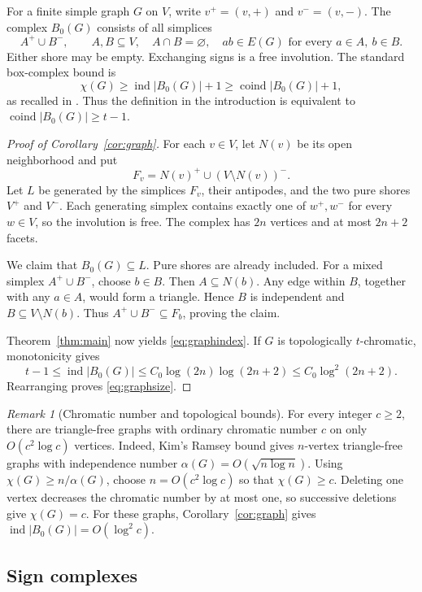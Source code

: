\documentclass[11pt]{article}
\theoremstyle{remark}
\newtheorem{remark}[theorem]{Remark}
\DeclareMathOperator{\ind}{ind}
\DeclareMathOperator{\coind}{coind}
\newcommand{\Czero}{C_0}
\begin{document}
For a finite simple graph $G$ on $V$, write $v^+=(v,+)$ and
$v^-=(v,-)$. The complex $B_0(G)$ consists of all simplices
\[
 A^+\cup B^-,\qquad A,B\subseteq V,\quad A\cap B=\varnothing,
 \quad ab\in E(G)\text{ for every }a\in A,\ b\in B.
\]
Either shore may be empty. Exchanging signs is a free involution.
The standard box-complex bound is
\[
 \chi(G)\geq\ind|B_0(G)|+1
 \geq\coind|B_0(G)|+1,
\]
as recalled in \cite{ST}. Thus the definition in the introduction
is equivalent to $\coind|B_0(G)|\geq t-1$.

\begin{proof}[Proof of Corollary~\ref{cor:graph}]
For each $v\in V$, let $N(v)$ be its open neighborhood and put
\[
 F_v=N(v)^+\cup(V\setminus N(v))^-.
\]
Let $L$ be generated by the simplices $F_v$, their antipodes, and
the two pure shores $V^+$ and $V^-$. Each generating simplex contains
exactly one of $w^+,w^-$ for every $w\in V$, so the involution is free.
The complex has $2n$ vertices and at most $2n+2$ facets.

We claim that $B_0(G)\subseteq L$. Pure shores are already included.
For a mixed simplex $A^+\cup B^-$, choose $b\in B$.
Then $A\subseteq N(b)$. Any edge within $B$, together with any
$a\in A$, would form a triangle. Hence $B$ is independent and
$B\subseteq V\setminus N(b)$.
Thus $A^+\cup B^-\subseteq F_b$, proving the claim.

Theorem~\ref{thm:main} now yields \eqref{eq:graphindex}.
If $G$ is topologically $t$-chromatic, monotonicity gives
\[
 t-1\leq\ind|B_0(G)|
 \leq\Czero\log(2n)\log(2n+2)
 \leq\Czero\log^2(2n+2).
\]
Rearranging proves \eqref{eq:graphsize}.
\end{proof}

\begin{remark}[Chromatic number and topological bounds]
For every integer $c\geq2$, there are triangle-free graphs with ordinary
chromatic number $c$ on only $O(c^2\log c)$ vertices.
Indeed, Kim's Ramsey bound \cite{Kim} gives $n$-vertex triangle-free
graphs with independence number $\alpha(G)=O(\sqrt{n\log n})$.
Using $\chi(G)\geq n/\alpha(G)$, choose $n=O(c^2\log c)$ so that
$\chi(G)\geq c$. Deleting one vertex decreases the chromatic number
by at most one, so successive deletions give $\chi(G)=c$.
For these graphs, Corollary~\ref{cor:graph} gives
$\ind|B_0(G)|=O(\log^2 c)$.
\end{remark}

\subsection{Sign complexes}
\end{document}
